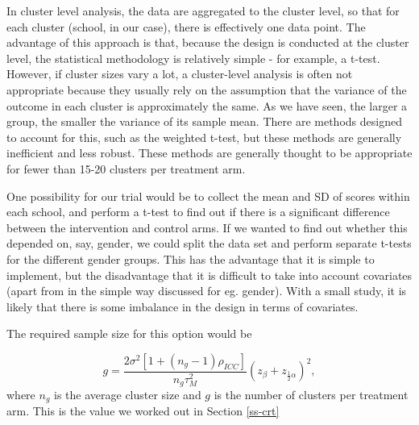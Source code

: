 \documentclass[
  openany]{book}
\theoremstyle{definition}
\theoremstyle{definition}
\theoremstyle{definition}
\theoremstyle{definition}
\theoremstyle{remark}
\begin{document}
In cluster level analysis, the data are aggregated to the cluster level, so that for each cluster (school, in our case), there is effectively one data point. The advantage of this approach is that, because the design is conducted at the cluster level, the statistical methodology is relatively simple - for example, a t-test. However, if cluster sizes vary a lot, a cluster-level analysis is often not appropriate because they usually rely on the assumption that the variance of the outcome in each cluster is approximately the same. As we have seen, the larger a group, the smaller the variance of its sample mean. There are methods designed to account for this, such as the weighted t-test, but these methods are generally inefficient and less robust. These methods are generally thought to be appropriate for fewer than 15-20 clusters per treatment arm.

One possibility for our trial would be to collect the mean and SD of scores within each school, and perform a t-test to find out if there is a significant difference between the intervention and control arms. If we wanted to find out whether this depended on, say, gender, we could split the data set and perform separate t-tests for the different gender groups. This has the advantage that it is simple to implement, but the disadvantage that it is difficult to take into account covariates (apart from in the simple way discussed for eg. gender). With a small study, it is likely that there is some imbalance in the design in terms of covariates.

The required sample size for this option would be

\[
g = \frac{2 \sigma^2 \left[1+ \left(n_g-1\right)\rho_{ICC}\right]}{n_g\tau^2_M}\left(z_{\beta} + z_{\frac{1}{2}\alpha}\right)^2,
\]
where \(n_g\) is the average cluster size and \(g\) is the number of clusters per treatment arm. This is the value we worked out in Section \ref{ss-crt}
\end{document}
